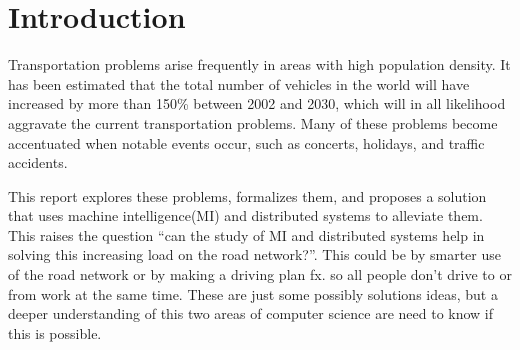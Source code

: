 \chapter{Introduction}\label{chap:introduction}

Transportation problems arise frequently in areas with high population density. It has been estimated that the total number of vehicles in the world will have increased by more than 150\% between 2002 and 2030\cite{dargay2007vehicle}, which will in all likelihood aggravate the current transportation problems. Many of these problems become accentuated when notable events occur, such as concerts, holidays, and traffic accidents.

This report explores these problems, formalizes them, and proposes a solution that uses machine intelligence(MI) and distributed systems to alleviate them. This raises the question ``can the study of MI and distributed systems help in solving this increasing load on the road network?''. This could be by smarter use of the road network or by making a driving plan fx. so all people don't drive to or from work at the same time. These are just some possibly solutions ideas, but a deeper understanding of this two areas of computer science are need to know if this is possible.

